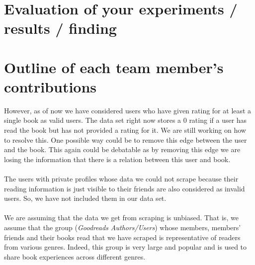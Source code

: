 \documentclass[11pt]{article}
\begin{document}
\section{Evaluation of your experiments / results / finding}
\section{Outline of each team member’s contributions}




However, as of now we have considered users who have given rating for at least a single book as valid users. The data set right now stores a 0 rating if a user has read the book but has not provided a rating for it. We are still working on how to resolve this. One possible way could be to remove this edge between the user and the book. This again could be debatable as by removing this edge we are losing the information that there is a relation between this user and book.\\\\
The users with private profiles whose data we could not scrape because their reading information is just visible to their friends are also considered as invalid users. So, we have not included them in our data set.\\\\
We are assuming that the data we get from scraping is unbiased. That is, we assume that the group ({\it Goodreads Authors/Users}) whose members, members' friends and their books read that we have scraped is representative of readers from various genres. Indeed, this group is very large and popular and is used to share book experiences across different genres.


\end{document}
